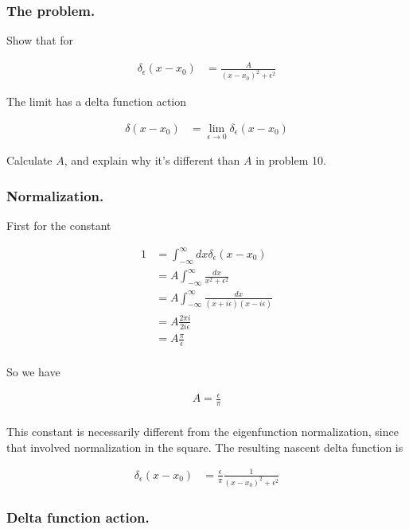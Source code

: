 \documentclass{article}
\newcommand{\IIinf}[0]{ \int_{-\infty}^\infty }
\begin{document}
\subsubsection{ The problem. }

Show that for

\begin{align*}
\delta_\epsilon(x - x_0) &= \frac{A}{(x-x_0)^2 + \epsilon^2}
\end{align*}

The limit has a delta function action

\begin{align*}
\delta(x - x_0) &= \lim_{\epsilon \rightarrow 0} \delta_\epsilon(x - x_0)
\end{align*}

Calculate $A$, and explain why it's different than $A$ in problem 10.

\subsubsection{ Normalization. }

First for the constant

\begin{align*}
1 &= \IIinf dx \delta_\epsilon(x - x_0) \\
&= A \IIinf \frac{dx}{x^2 + \epsilon^2} \\
&= A \IIinf \frac{dx}{(x + i\epsilon)(x - i \epsilon)} \\
&= A \frac{2 \pi i}{ 2 i \epsilon } \\
&= A \frac{\pi}{\epsilon } \\
\end{align*}

So we have

\begin{align*}
A = \frac{\epsilon }{\pi} \\
\end{align*}

This constant is necessarily different from the eigenfunction normalization, since that involved normalization in the square.  The resulting 
nascent delta function is

\begin{align*}
\delta_\epsilon(x - x_0) &= \frac{\epsilon }{\pi} \frac{1}{(x-x_0)^2 + \epsilon^2}
\end{align*}

\subsubsection{ Delta function action. }
\end{document}
